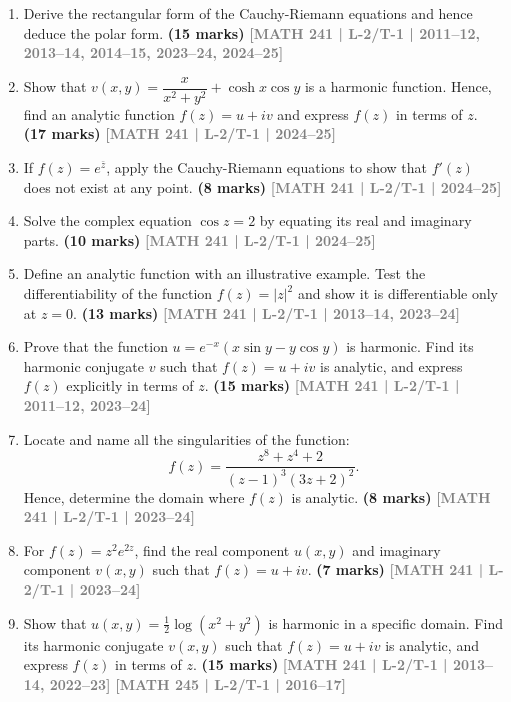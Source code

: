 \documentclass[12pt]{article}
\newcommand{\yr}[1]{\hfill\textcolor{gray}{\small\textbf{[#1]}}}
\newcommand{\mk}[1]{\textcolor{orange!70!black}{\small\textbf{(#1 marks)}}}
\begin{document}
\begin{enumerate}

\item Derive the rectangular form of the Cauchy-Riemann equations and hence deduce the polar form.
\mk{15} \yr{MATH 241 | L-2/T-1 | 2011--12, 2013--14, 2014--15, 2023--24, 2024--25}

\item Show that $v(x,y)=\dfrac{x}{x^{2}+y^{2}}+\cosh x\cos y$ is a harmonic function. Hence, find an analytic function $f(z)=u+iv$ and express $f(z)$ in terms of $z$.
\mk{17} \yr{MATH 241 | L-2/T-1 | 2024--25}

\item If $f(z)=e^{\bar{z}}$, apply the Cauchy-Riemann equations to show that $f'(z)$ does not exist at any point.
\mk{8} \yr{MATH 241 | L-2/T-1 | 2024--25}

\item Solve the complex equation $\cos z=2$ by equating its real and imaginary parts.
\mk{10} \yr{MATH 241 | L-2/T-1 | 2024--25}


\item Define an analytic function with an illustrative example. Test the differentiability of the function $f(z)=|z|^{2}$ and show it is differentiable only at $z=0$.
\mk{13} \yr{MATH 241 | L-2/T-1 | 2013--14, 2023--24}

\item Prove that the function $u=e^{-x}(x\sin y - y\cos y)$ is harmonic. Find its harmonic conjugate $v$ such that $f(z)=u+iv$ is analytic, and express $f(z)$ explicitly in terms of $z$.
\mk{15} \yr{MATH 241 | L-2/T-1 | 2011--12, 2023--24}

\item Locate and name all the singularities of the function:
\[
f(z)=\frac{z^{8}+z^{4}+2}{(z-1)^{3}(3z+2)^{2}}.
\]
Hence, determine the domain where $f(z)$ is analytic.
\mk{8} \yr{MATH 241 | L-2/T-1 | 2023--24}


\item For $f(z)=z^{2}e^{2z}$, find the real component $u(x,y)$ and imaginary component $v(x,y)$ such that $f(z)=u+iv$.
\mk{7} \yr{MATH 241 | L-2/T-1 | 2023--24}

\item Show that $u(x,y)=\tfrac{1}{2}\log(x^{2}+y^{2})$ is harmonic in a specific domain. Find its harmonic conjugate $v(x,y)$ such that $f(z)=u+iv$ is analytic, and express $f(z)$ in terms of $z$.
\mk{15} \yr{MATH 241 | L-2/T-1 | 2013--14, 2022--23} \yr{MATH 245 | L-2/T-1 | 2016--17}




\end{enumerate}
\end{document}
